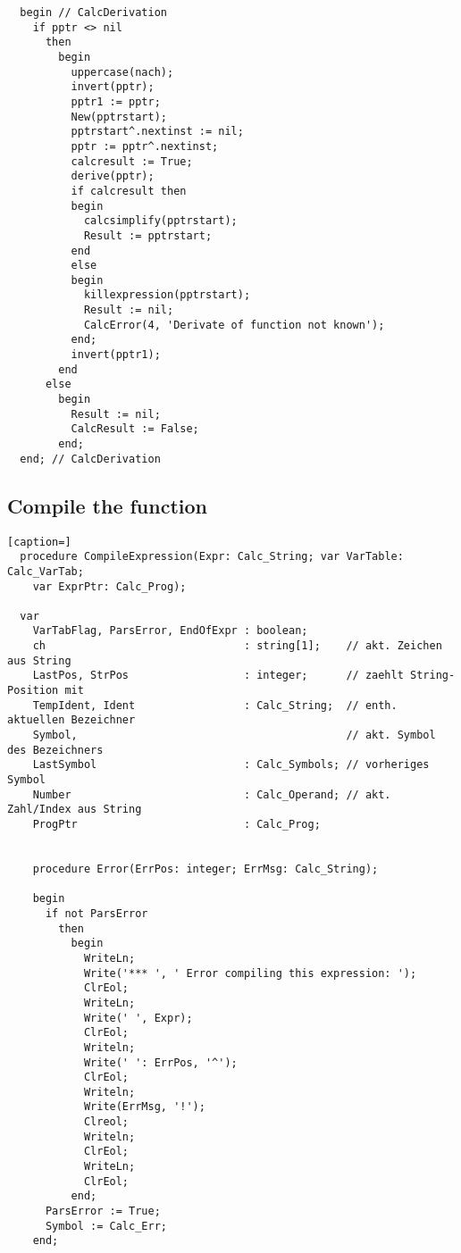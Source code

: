 \begin{refsection}
\begin{lstlisting}
  begin // CalcDerivation
    if pptr <> nil
      then
        begin
          uppercase(nach);
          invert(pptr);
          pptr1 := pptr;
          New(pptrstart);
          pptrstart^.nextinst := nil;
          pptr := pptr^.nextinst;
          calcresult := True;
          derive(pptr);
          if calcresult then
          begin
            calcsimplify(pptrstart);
            Result := pptrstart;
          end
          else
          begin
            killexpression(pptrstart);
            Result := nil;
            CalcError(4, 'Derivate of function not known');
          end;
          invert(pptr1);
        end
      else
        begin
          Result := nil;
          CalcResult := False;
        end;
  end; // CalcDerivation
\end{lstlisting}

\subsection{Compile the function}

\begin{lstlisting}[caption=]
  procedure CompileExpression(Expr: Calc_String; var VarTable: Calc_VarTab;
    var ExprPtr: Calc_Prog);

  var
    VarTabFlag, ParsError, EndOfExpr : boolean;
    ch                               : string[1];    // akt. Zeichen aus String
    LastPos, StrPos                  : integer;      // zaehlt String-Position mit
    TempIdent, Ident                 : Calc_String;  // enth. aktuellen Bezeichner
    Symbol,                                          // akt. Symbol des Bezeichners
    LastSymbol                       : Calc_Symbols; // vorheriges Symbol
    Number                           : Calc_Operand; // akt. Zahl/Index aus String
    ProgPtr                          : Calc_Prog;


    procedure Error(ErrPos: integer; ErrMsg: Calc_String);

    begin
      if not ParsError
        then
          begin
            WriteLn;
            Write('*** ', ' Error compiling this expression: ');
            ClrEol;
            WriteLn;
            Write(' ', Expr);
            ClrEol;
            Writeln;
            Write(' ': ErrPos, '^');
            ClrEol;
            Writeln;
            Write(ErrMsg, '!');
            Clreol;
            Writeln;
            ClrEol;
            WriteLn;
            ClrEol;
          end;
      ParsError := True;
      Symbol := Calc_Err;
    end;



\end{lstlisting}
\end{refsection}

